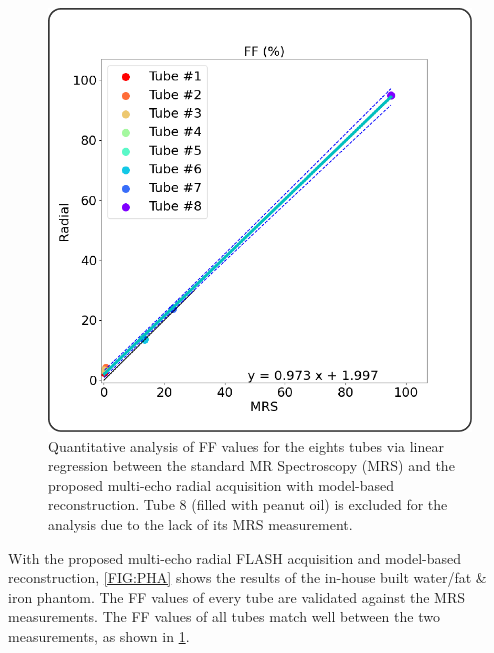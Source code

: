 \documentclass[journal,twoside,web]{ieeecolor}
\begin{document}
\begin{figure}
	\centering
	\includegraphics[width=\columnwidth]{../../figures/tan4.pdf}
	\caption{Quantitative analysis of FF values 
			for the eights tubes via linear regression 
			between the standard MR Spectroscopy (MRS) 
			and the proposed multi-echo radial acquisition 
			with model-based reconstruction. 
			Tube 8 (filled with peanut oil) is excluded for the analysis 
			due to the lack of its MRS measurement.}
	\label{FIG:PHA_LINFIT}
\end{figure}

With the proposed multi-echo radial FLASH acquisition and 
model-based reconstruction, \cref{FIG:PHA} shows the results 
of the in-house built water/fat \& iron phantom. 
The FF values of every tube are validated against 
the MRS measurements. 
The FF values of all tubes match well between the two measurements, 
as shown in \cref{FIG:PHA_LINFIT}. 
\end{document}
